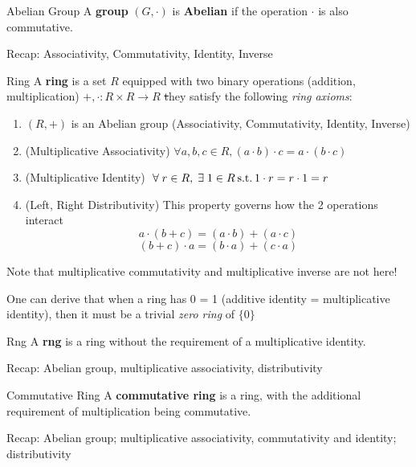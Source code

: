 \documentclass[a4paper, 10pt]{article}
\begin{document}
\begin{definition} {Abelian Group}
    A \textbf{group} \((G, \cdot)\) is \textbf{Abelian} if the operation \(\cdot\) is also commutative.

    Recap: Associativity, Commutativity, Identity, Inverse
\end{definition}
\begin{definition} {Ring}
    A \textbf{ring} is a set \(R\) equipped with two binary operations (addition, multiplication) \(+, \cdot: R \times R \to R\) \st they satisfy the following \textit{ring axioms}:

    \begin{enumerate}
        \item \((R, +)\) is an Abelian group (Associativity, Commutativity, Identity, Inverse)
        \item (Multiplicative Associativity) \(\forall a, b, c \in R, (a \cdot b) \cdot c = a \cdot (b \cdot c)\)
        \item (Multiplicative Identity) \(\forall r \in R, \exists 1 \in R \st 1 \cdot r = r \cdot 1 = r\)
        \item (Left, Right Distributivity) This property governs how the 2 operations interact \[
                  a \cdot (b + c) = (a \cdot b) + (a \cdot c)
              \]
              \[
                  (b + c) \cdot a = (b \cdot a) + (c \cdot a)
              \]
    \end{enumerate}

    Note that multiplicative commutativity and multiplicative inverse are not here!
\end{definition}

\begin{remark}
    One can derive that when a ring has 0 = 1 (additive identity = multiplicative identity), then it must be a trivial \textit{zero ring} of \(\{0\}\)
\end{remark}

\begin{definition} {Rng}
    A \textbf{rng} is a ring without the requirement of a multiplicative identity.

    Recap: Abelian group, multiplicative associativity, distributivity
\end{definition}

\begin{definition} {Commutative Ring}
    A \textbf{commutative ring} is a ring, with the additional requirement of multiplication being commutative.

    Recap: Abelian group; multiplicative associativity, commutativity and identity; distributivity
\end{definition}
\end{document}
